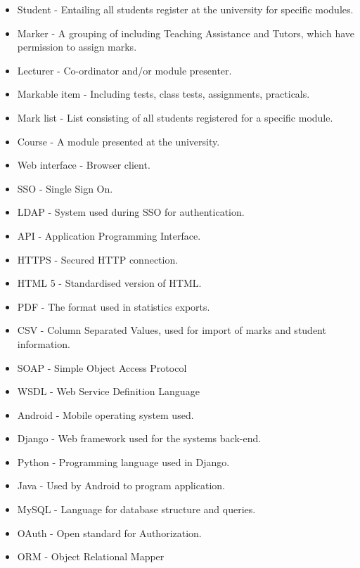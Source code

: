 \documentclass[12pt]{article}
\begin{document}
		\vspace{0.2in}
		\begin{itemize}
			\item Student - Entailing all students register at the university for specific modules.
			\item Marker - A grouping of including Teaching Assistance and Tutors, which have permission to assign marks.
			\item Lecturer - Co-ordinator and/or module presenter.
			
			\item Markable item - Including tests, class tests, assignments, practicals.
			\item Mark list - List consisting of all students registered for a specific module.
			\item Course - A module presented at the university.
			
			\item Web interface - Browser client.
			\item SSO - Single Sign On.
			\item LDAP - System used during SSO for authentication.
			\item API -	Application Programming Interface.
			\item HTTPS - Secured HTTP connection.
			\item HTML 5 - Standardised version of HTML.
			\item PDF -	The format used in statistics exports.
			\item CSV -	Column Separated Values, used for import of marks and student information.
			\item SOAP - Simple Object Access Protocol	
			\item WSDL - Web Service Definition Language
			\item Android - Mobile operating system used.
			\item Django - Web framework used for the systems back-end.
			\item Python - Programming language used in Django.
			\item Java - Used by Android to program application.
			\item MySQL - Language for database structure and queries.
			\item OAuth - Open standard for Authorization.
			\item ORM - Object Relational Mapper
		\end{itemize}	
	
\end{document}
